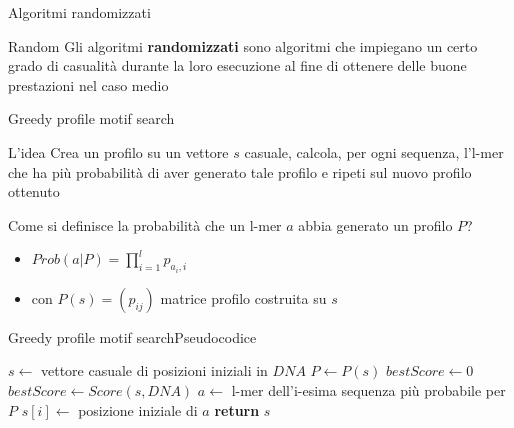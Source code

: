 	\begin{frame}{Algoritmi randomizzati}
		\begin{block}{Random}
			Gli algoritmi \alert{\textbf{randomizzati}} sono algoritmi che impiegano un certo grado di casualità durante la loro esecuzione al fine di ottenere delle buone prestazioni nel caso medio
		\end{block}
	\end{frame}
	
	\begin{frame}{Greedy profile motif search}
		\begin{block}{L'idea}
			Crea un profilo su un vettore $s$ casuale, calcola, per ogni sequenza, l'l-mer che ha più probabilità di aver generato tale profilo e ripeti sul nuovo profilo ottenuto
		\end{block}
		\pause
		Come si definisce la  probabilità che un l-mer $a$ abbia generato un profilo $P$?
		\pause
		\begin{itemize}
			\item $Prob(a|P)=\prod_{i=1}^{l}p_{a_i,i}$
			\item con $P(s)=(p_{ij})$ matrice profilo costruita su $s$ 
		\end{itemize}
	\end{frame}
	
	\begin{frame}{Greedy profile motif search}{Pseudocodice}
		\begin{center}
			\begin{minipage}{10.5cm}
			    \begin{algorithmic}[1]
				    	\State $s\gets$  vettore casuale di posizioni iniziali in $DNA$
				    	\State $P\gets P(s)$
				    	\State $bestScore\gets 0$
				    		\State $bestScore\gets Score(s,DNA)$
				    			\State $a\gets $ l-mer dell'i-esima sequenza più probabile per $P$
				    			\State $s[i]\gets $ posizione iniziale di $a$
				    		\EndFor
				    	\EndWhile
				    	\State \textbf{return} $s$
				    \EndProcedure
			    \end{algorithmic}
			\end{minipage}
	    \end{center}
	\end{frame}
	
